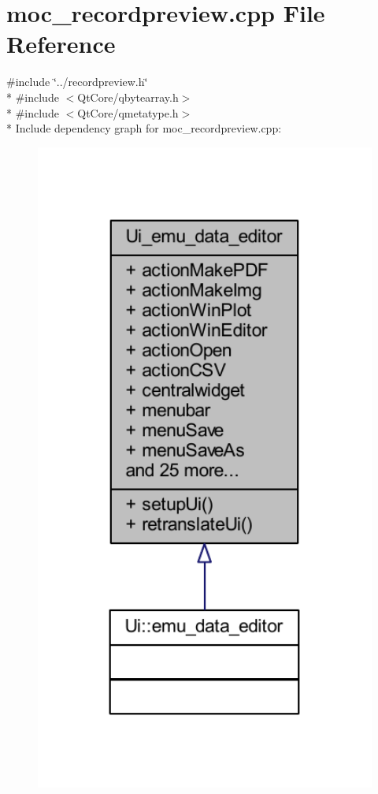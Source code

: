 \hypertarget{a00068}{\section{moc\+\_\+recordpreview.\+cpp File Reference}
\label{a00068}
}
{\ttfamily \#include \char`\"{}../recordpreview.\+h\char`\"{}}\\*
{\ttfamily \#include $<$Qt\+Core/qbytearray.\+h$>$}\\*
{\ttfamily \#include $<$Qt\+Core/qmetatype.\+h$>$}\\*
Include dependency graph for moc\+\_\+recordpreview.\+cpp\+:
\nopagebreak
\begin{figure}[H]
\begin{center}
\leavevmode
\includegraphics[width=350pt]{d1/d5d/a00311}
\end{center}
\end{figure}
